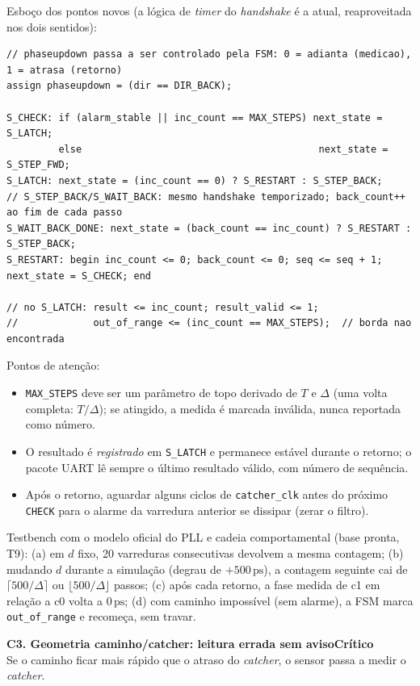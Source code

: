 \documentclass[11pt,a4paper]{article}
\newcommand{\campo}[1]{\vspace{5pt}\noindent{\bfseries\color{lescgray}#1}\par\vspace{1pt}}
\newcommand{\problema}[3]{%
  \vspace{8pt}
  \noindent\begin{tcolorbox}[enhanced,colback=lescblue,colframe=lescblue,
    boxrule=0pt,left=9pt,right=9pt,top=5pt,bottom=5pt,arc=2pt]
    {\color{white}\bfseries #1}\hfill{\color{white!80!lescblue}\small\bfseries #2}\\[1pt]
    {\color{white!82!lescblue}\small #3}
  \end{tcolorbox}\vspace{2pt}}
\newcommand{\ps}{\ensuremath{\,\mathrm{ps}}\xspace}
\begin{document}
\noindent Esboço dos pontos novos (a lógica de \emph{timer} do \emph{handshake} é a atual,
reaproveitada nos dois sentidos):
\begin{lstlisting}
// phaseupdown passa a ser controlado pela FSM: 0 = adianta (medicao), 1 = atrasa (retorno)
assign phaseupdown = (dir == DIR_BACK);

S_CHECK: if (alarm_stable || inc_count == MAX_STEPS) next_state = S_LATCH;
         else                                         next_state = S_STEP_FWD;
S_LATCH: next_state = (inc_count == 0) ? S_RESTART : S_STEP_BACK;
// S_STEP_BACK/S_WAIT_BACK: mesmo handshake temporizado; back_count++ ao fim de cada passo
S_WAIT_BACK_DONE: next_state = (back_count == inc_count) ? S_RESTART : S_STEP_BACK;
S_RESTART: begin inc_count <= 0; back_count <= 0; seq <= seq + 1; next_state = S_CHECK; end

// no S_LATCH: result <= inc_count; result_valid <= 1;
//             out_of_range <= (inc_count == MAX_STEPS);  // borda nao encontrada
\end{lstlisting}
Pontos de atenção:
\begin{itemize}
  \item \texttt{MAX\_STEPS} deve ser um parâmetro de topo derivado de $T$ e $\Delta$
        (uma volta completa: $T/\Delta$); se atingido, a medida é marcada inválida, nunca reportada como número.
  \item O resultado é \emph{registrado} em \texttt{S\_LATCH} e permanece estável durante o
        retorno; o pacote UART lê sempre o último resultado válido, com número de sequência.
  \item Após o retorno, aguardar alguns ciclos de \texttt{catcher\_clk} antes do próximo
        \texttt{CHECK} para o alarme da varredura anterior se dissipar (zerar o filtro).
\end{itemize}

\campo{Como verificar}
Testbench com o modelo oficial do PLL e cadeia comportamental (base pronta, T9): (a) em
$d$ fixo, 20 varreduras consecutivas devolvem a mesma contagem; (b) mudando $d$ durante a
simulação (degrau de $+500\ps$), a contagem seguinte cai de $\lceil 500/\Delta\rceil$ ou
$\lfloor 500/\Delta\rfloor$ passos; (c) após cada retorno, a fase medida de c1 em relação a c0
volta a 0\ps; (d) com caminho impossível (sem alarme), a FSM marca \texttt{out\_of\_range} e
recomeça, sem travar.

\problema{C3. Geometria caminho/catcher: leitura errada sem aviso}{Crítico}
{Se o caminho ficar mais rápido que o atraso do \emph{catcher}, o sensor passa a medir o \emph{catcher}.}
\label{sec:catcher}
\end{document}
